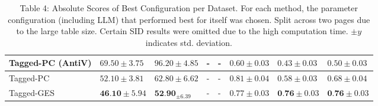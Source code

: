 \documentclass[10pt]{article}
\begin{document}
\begin{table}[h]
\begin{center}
\begin{tabular}{|l|l|l|l|l|l|l|l|}
\hline
Tagged-PC (AntiV) & $69.50 \pm 3.75$ & $96.20 \pm 4.85$ & - & - & $0.60 \pm 0.03$ & $0.43 \pm 0.03$ & $0.50 \pm 0.03$ \\
\hline
Tagged-PC & $52.10 \pm 3.81$ & $62.80 \pm 6.62$ & - & - & $0.81 \pm 0.04$ & $0.58 \pm 0.03$ & $0.68 \pm 0.04$ \\
\hline
Tagged-GES & $\mathbf{4 6 . 1 0} \pm 5.94$ & $\mathbf{5 2 . 9 0}_{ \pm 6.39}$ & - & - & $0.77 \pm 0.03$ & $\mathbf{0 . 7 6} \pm 0.03$ & $\mathbf{0 . 7 6} \pm 0.03$ \\
\hline
\end{tabular}
\captionsetup{labelformat=empty}
\caption{Table 4: Absolute Scores of Best Configuration per Dataset. For each method, the parameter configuration (including LLM) that performed best for itself was chosen. Split across two pages due to the large table size. Certain SID results were omitted due to the high computation time. $\pm y$ indicates std. deviation.}
\end{center}
\end{table}
\end{document}
